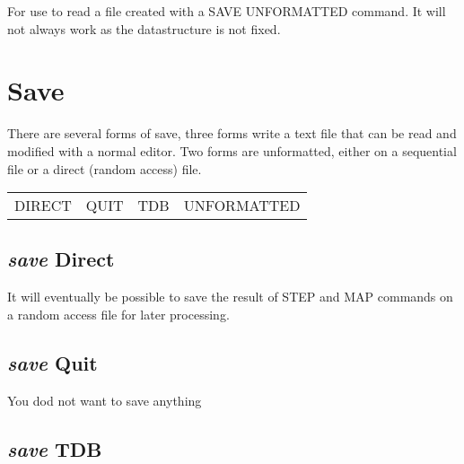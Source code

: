 \documentclass[12pt]{article}
\begin{document}
For use to read a file created with a SAVE UNFORMATTED command.  It
will not always work as the datastructure is not fixed.

\section{Save }

There are several forms of save, three forms write a text file that
can be read and modified with a normal editor.  Two forms are
unformatted, either on a sequential file or a direct (random access)
file.

\begin{tabular}{llll}
 DIRECT          & QUIT    & TDB &         UNFORMATTED\\
\end{tabular}

\subsection{{\em save} Direct}

It will eventually be possible to save the result of STEP and MAP
commands on a random access file for later processing.

\subsection{{\em save} Quit}

You dod not want to save anything

\subsection{{\em save} TDB}
\end{document}
